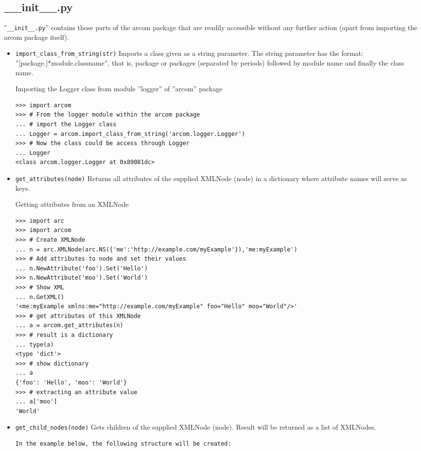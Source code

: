 \documentclass{article}
\begin{document}
\subsection{\_\_init\_\_.py}
\label{ainit}
''\verb$__init__.py$'' contains those parts of the arcom package that are
readily accessible without any further action (apart from importing the 
arcom package itself).
\begin{flushleft}
\begin{itemize}
  \item{\verb$import_class_from_string(str)$\newline
  Imports a class given as a string parameter.\newline
  The string parameter has the format: ''[package.]*module.classname'',
  that is, package or packages (separated by periods) followed by 
  module name and finally the class name.
    \begin{example}
      \caption{Importing the Logger class from module ''logger'' of ''arcom'' package}\label{loglog}
\begin{verbatim}
>>> import arcom
>>> # From the logger module within the arcom package
... # import the Logger class
... Logger = arcom.import_class_from_string('arcom.logger.Logger')
>>> # Now the class could be access through Logger
... Logger
<class arcom.logger.Logger at 0x89081dc>
\end{verbatim}
    \end{example}
  }
\end{itemize}
\begin{itemize}
  \item{ \verb$get_attributes(node)$\newline
  Returns all attributes of the supplied XMLNode (node) in a dictionary
  where attribute names will serve as keys.
    \begin{example}
      \caption{Getting attributes from an XMLNode}\label{getattr}
\begin{verbatim}
>>> import arc
>>> import arcom
>>> # Create XMLNode
... n = arc.XMLNode(arc.NS({'me':'http://example.com/myExample'}),'me:myExample')
>>> # Add attributes to node and set their values
... n.NewAttribute('foo').Set('Hello')
>>> n.NewAttribute('moo').Set('World')
>>> # Show XML
... n.GetXML()
'<me:myExample xmlns:me="http://example.com/myExample" foo="Hello" moo="World"/>'
>>> # get attributes of this XMLNode
... a = arcom.get_attributes(n)
>>> # result is a dictionary
... type(a)
<type 'dict'>
>>> # show dictionary
... a
{'foo': 'Hello', 'moo': 'World'}
>>> # extracting an attribute value
... a['moo']
'World'
\end{verbatim}
    \end{example}
  }
\end{itemize}
\newpage
\begin{itemize}
  \item{ \verb$get_child_nodes(node)$\newline
  Gets children of the supplied XMLNode (node).
  Result will be returned as a list of XMLNodes.
\begin{verbatim}
In the example below, the following structure will be created:


\end{verbatim}}
\end{itemize}
\end{flushleft}
\end{document}
